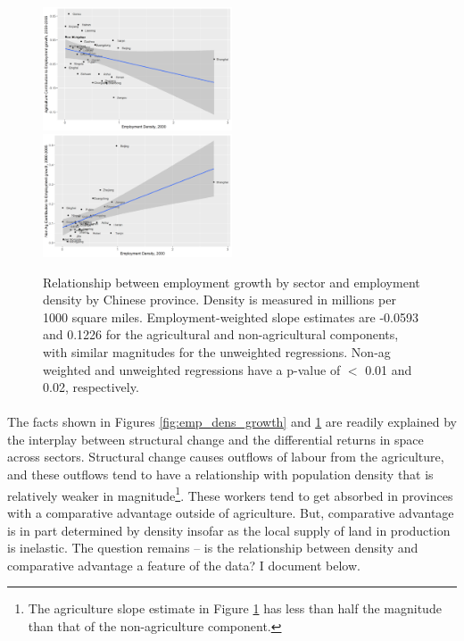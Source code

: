\documentclass[]{article}
\theoremstyle{plain}
\begin{document}
\begin{center}
	\begin{figure}[h]
		\includegraphics[width=0.5\textwidth]{ag_cont_growth_density.png}
		\includegraphics[width=0.5\textwidth]{na_cont_growth_density.png}
		\caption{Relationship between employment growth by sector and employment density by Chinese province. Density is measured in millions per 1000 square miles. Employment-weighted slope estimates are -0.0593 and 0.1226 for the agricultural and non-agricultural components, with similar magnitudes for the unweighted regressions. Non-ag weighted and unweighted regressions have a p-value of $<$ 0.01 and 0.02, respectively.}
		\label{fig:na_emp_dens_growth}
	\end{figure}
\end{center}

\paragraph*{}
The facts shown in Figures \ref{fig:emp_dens_growth} and \ref{fig:na_emp_dens_growth} are readily explained by the interplay between structural change and the differential returns in space across sectors. Structural change causes outflows of labour from the agriculture, and these outflows tend to have a relationship with population density that is relatively weaker in magnitude\footnote{The agriculture slope estimate in Figure \ref{fig:na_emp_dens_growth} has less than half the magnitude than that of the non-agriculture component.}. These workers tend to get absorbed in provinces with a comparative advantage outside of agriculture. But, comparative advantage is in part determined by density insofar as the local supply of land in production is inelastic. The question remains -- is the relationship between density and comparative advantage a feature of the data? I document below. 
\end{document}
